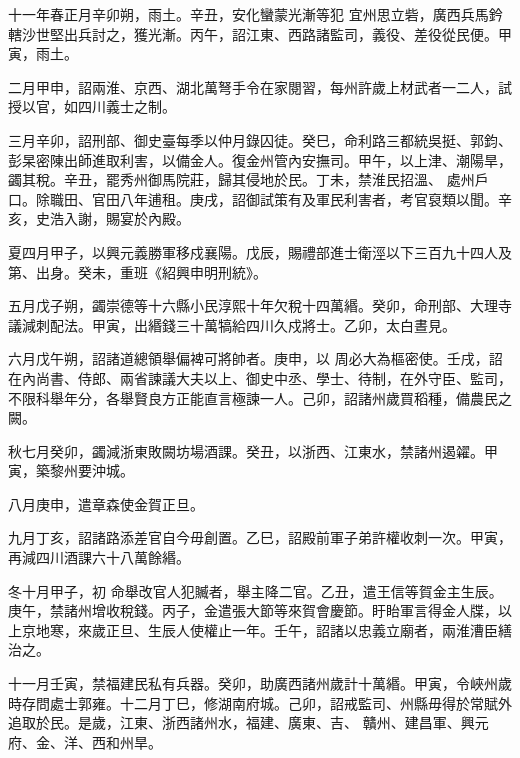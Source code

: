 \begin{pinyinscope}
 十一年春正月辛卯朔，雨土。辛丑，安化蠻蒙光漸等犯
 宜州思立砦，廣西兵馬鈐轄沙世堅出兵討之，獲光漸。丙午，詔江東、西路諸監司，義役、差役從民便。甲寅，雨土。



 二月甲申，詔兩淮、京西、湖北萬弩手令在家閱習，每州許歲上材武者一二人，試授以官，如四川義士之制。



 三月辛卯，詔刑部、御史臺每季以仲月錄囚徒。癸巳，命利路三都統吳挺、郭鈞、彭杲密陳出師進取利害，以備金人。復金州管內安撫司。甲午，以上津、潮陽旱，蠲其稅。辛丑，罷秀州御馬院莊，歸其侵地於民。丁未，禁淮民招溫、
 處州戶口。除職田、官田八年逋租。庚戌，詔御試策有及軍民利害者，考官裒類以聞。辛亥，史浩入謝，賜宴於內殿。



 夏四月甲子，以興元義勝軍移戍襄陽。戊辰，賜禮部進士衛涇以下三百九十四人及第、出身。癸未，重班《紹興申明刑統》。



 五月戊子朔，蠲崇德等十六縣小民淳熙十年欠稅十四萬緡。癸卯，命刑部、大理寺議減刺配法。甲寅，出緡錢三十萬犒給四川久戍將士。乙卯，太白晝見。



 六月戊午朔，詔諸道總領舉偏裨可將帥者。庚申，以
 周必大為樞密使。壬戌，詔在內尚書、侍郎、兩省諫議大夫以上、御史中丞、學士、待制，在外守臣、監司，不限科舉年分，各舉賢良方正能直言極諫一人。己卯，詔諸州歲買稻種，備農民之闕。



 秋七月癸卯，蠲減浙東敗闕坊場酒課。癸丑，以浙西、江東水，禁諸州遏糴。甲寅，築黎州要沖城。



 八月庚申，遣章森使金賀正旦。



 九月丁亥，詔諸路添差官自今毋創置。乙巳，詔殿前軍子弟許權收刺一次。甲寅，再減四川酒課六十八萬餘緡。



 冬十月甲子，初
 命舉改官人犯贓者，舉主降二官。乙丑，遣王信等賀金主生辰。庚午，禁諸州增收稅錢。丙子，金遣張大節等來賀會慶節。盱眙軍言得金人牒，以上京地寒，來歲正旦、生辰人使權止一年。壬午，詔諸以忠義立廟者，兩淮漕臣繕治之。



 十一月壬寅，禁福建民私有兵器。癸卯，助廣西諸州歲計十萬緡。甲寅，令峽州歲時存問處士郭雍。十二月丁巳，修湖南府城。己卯，詔戒監司、州縣毋得於常賦外追取於民。是歲，江東、浙西諸州水，福建、廣東、吉、
 贛州、建昌軍、興元府、金、洋、西和州旱。




\end{pinyinscope}
